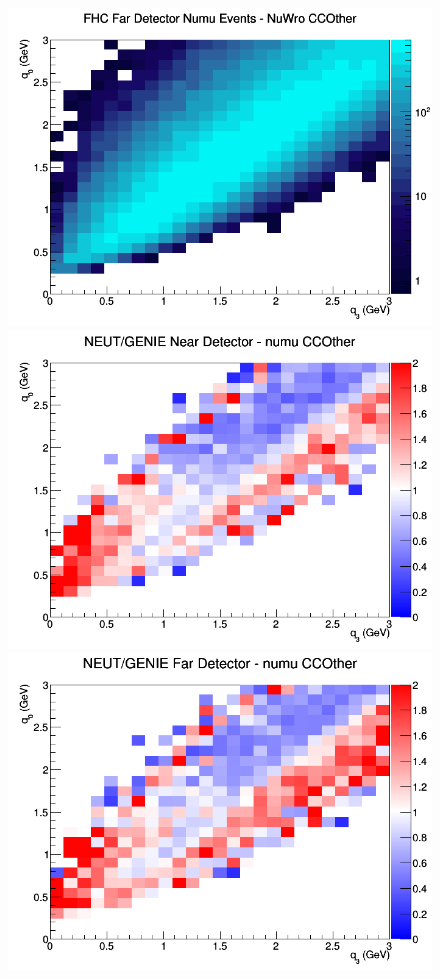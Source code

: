 \begin{figure}[h]
\endminipage
{}
\includegraphics[width=\linewidth]{eff_q0_q3/GAr/CCOther_FHC_FD_numu_q3_q0_NuWro.png}
\endminipage
\newline
{}
\includegraphics[width=\linewidth]{eff_q0_q3/GAr/ratios/CCOther_NEUT_GENIE_numu_near_q3_q0.png}
\endminipage
{}
\includegraphics[width=\linewidth]{eff_q0_q3/GAr/ratios/CCOther_NEUT_GENIE_numu_far_q3_q0.png}

\end{figure}
